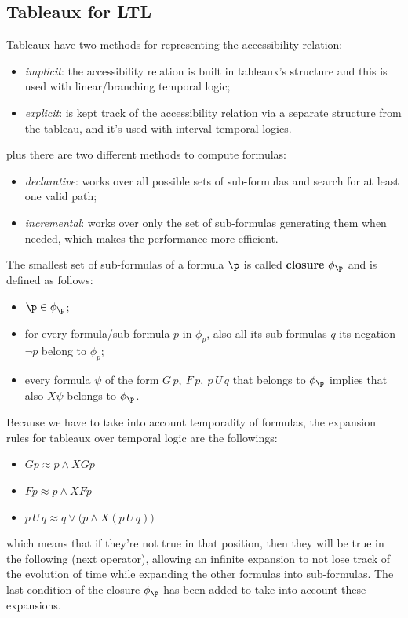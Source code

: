\documentclass[oneside]{academica}
\begin{document}
\subsection{Tableaux for LTL}

Tableaux have two methods for representing the accessibility relation:
\begin{itemize}
  \item \emph{implicit}: the accessibility relation is built in tableaux's structure and this is used with linear/branching temporal logic;
  \item \emph{explicit}: is kept track of the accessibility relation via a separate structure from the tableau, and it's used with interval temporal logics.
\end{itemize}
plus there are two different methods to compute formulas:
\begin{itemize}
  \item \emph{declarative}: works over all possible sets of sub-formulas and search for at least one valid path;
  \item \emph{incremental}: works over only the  set of sub-formulas generating them when needed, which makes the performance more efficient.
\end{itemize}

\begin{definition}[Closure of $\p$]\label{def:closure_phi}
  The smallest set of sub-formulas of a formula $\p$ is called \textbf{closure} $\phi_\p$ and is defined as follows:
  \begin{itemize}
    \item $\p \in \phi_\p$;
    \item for every formula/sub-formula $p$ in $\phi_p$, also all its sub-formulas $q$ its negation $\neg p$ belong to $\phi_p$;
    \item every formula $\psi$ of the form $G\, p,\ F\, p,\ p\,U\,q$ that belongs to $\phi_\p$ implies that also $X \psi$ belongs to $\phi_\p$.
  \end{itemize}
\end{definition}

Because we have to take into account temporality of formulas, the expansion rules for tableaux over temporal logic are the followings:
\begin{itemize}
  \item $G p \approx p \land XG p$
  \item $F p \approx p \land XF p$
  \item $p\,U\,q \approx q \lor \big(p \land X(p\,U\,q) \big)$
\end{itemize}
which means that if they're not true in that position, then they will be true in the following (next operator), allowing an infinite expansion to not lose track of the evolution of time while expanding the other formulas into sub-formulas.
The last condition of the closure $\phi_\p$ has been added to take into account these expansions.
\end{document}
